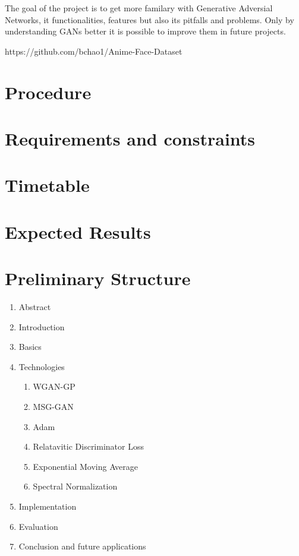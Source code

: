 \documentclass[conference,onecolumn,compsoc]{IEEEtran}
\begin{document}
\noindent
The goal of the project is to get more familary with Generative Adversial Networks, it functionalities, features but also its pitfalls and problems. Only by understanding GANs better it is possible to improve them in future projects.

https://github.com/bchao1/Anime-Face-Dataset


\section{Procedure}

\noindent
\blindtext

\section{Requirements and constraints}

\blindtext

\section{Timetable}

\noindent
\blindtext \cite{yazıcı2019unusual}

\section{Expected Results}

\noindent
\blindtext


\section{Preliminary  Structure}

\noindent
\begin{enumerate}
  \item Abstract
  \item Introduction
  \item Basics \cite{goodfellow2014generative}
  \item Technologies
  \begin{enumerate}
    \item WGAN-GP \cite{arjovsky2017wasserstein,gulrajani2017improved}
    \item MSG-GAN \cite{karnewar2020msggan}
    \item Adam \cite{kingma2017adam}
    \item Relatavitic Discriminator Loss \cite{jolicoeurmartineau2018relativistic}
    \item Exponential Moving Average \cite{yazıcı2019unusual}
    \item Spectral Normalization \cite{miyato2018spectral}
  \end{enumerate}
  \item Implementation
  \item Evaluation
  \item Conclusion and future applications
\end{enumerate}


\newpage


\printbibliography
\end{document}
